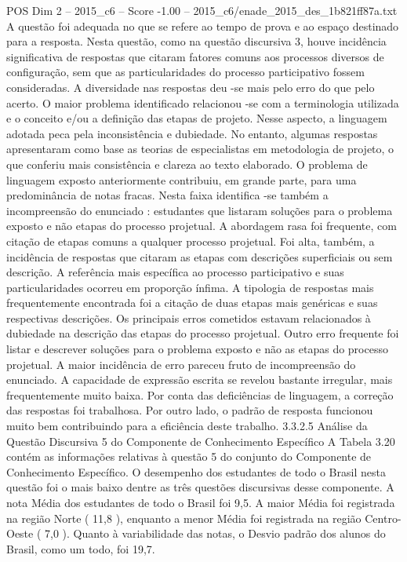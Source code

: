 \begin{textsample}{POS Dim 2 – 2015\_c6 – Score -1.00 – 2015\_c6/enade\_2015\_des\_1b821ff87a.txt}
A questão foi adequada no que se refere ao tempo de prova e ao espaço destinado para a resposta.
Nesta questão, como na questão discursiva 3, houve incidência significativa de respostas que citaram fatores comuns aos processos diversos de configuração, sem que as particularidades do processo participativo fossem consideradas.
A diversidade nas respostas deu -se mais pelo erro do que pelo acerto.
O maior problema identificado relacionou -se com a terminologia utilizada e o conceito e/ou a definição das etapas de projeto.
Nesse aspecto, a linguagem adotada peca pela inconsistência e dubiedade.
No entanto, algumas respostas apresentaram como base as teorias de especialistas em metodologia de projeto, o que conferiu mais consistência e clareza ao texto elaborado.
O problema de linguagem exposto anteriormente contribuiu, em grande parte, para uma predominância de notas fracas.
Nesta faixa identifica -se também a incompreensão do enunciado : estudantes que listaram soluções para o problema exposto e não etapas do processo projetual.
A abordagem rasa foi frequente, com citação de etapas comuns a qualquer processo projetual.
Foi alta, também, a incidência de respostas que citaram as etapas com descrições superficiais ou sem descrição.
A referência mais específica ao processo participativo e suas particularidades ocorreu em proporção ínfima.
A tipologia de respostas mais frequentemente encontrada foi a citação de duas etapas mais genéricas e suas respectivas descrições.
Os principais erros cometidos estavam relacionados à dubiedade na descrição das etapas do processo projetual.
Outro erro frequente foi listar e descrever soluções para o problema exposto e não as etapas do processo projetual.
A maior incidência de erro pareceu fruto de incompreensão do enunciado.
A capacidade de expressão escrita se revelou bastante irregular, mais frequentemente muito baixa.
Por conta das deficiências de linguagem, a correção das respostas foi trabalhosa.
Por outro lado, o padrão de resposta funcionou muito bem contribuindo para a eficiência deste trabalho. 3.3.2.5 Análise da Questão Discursiva 5 do Componente de Conhecimento Específico A Tabela 3.20 contém as informações relativas à questão 5 do conjunto do Componente de Conhecimento Específico.
O desempenho dos estudantes de todo o Brasil nesta questão foi o mais baixo dentre as três questões discursivas desse componente.
A nota Média dos estudantes de todo o Brasil foi 9,5.
A maior Média foi registrada na região Norte ( 11,8 ), enquanto a menor Média foi registrada na região Centro-Oeste ( 7,0 ).
Quanto à variabilidade das notas, o Desvio padrão dos alunos do Brasil, como um todo, foi 19,7.

\end{textsample}
